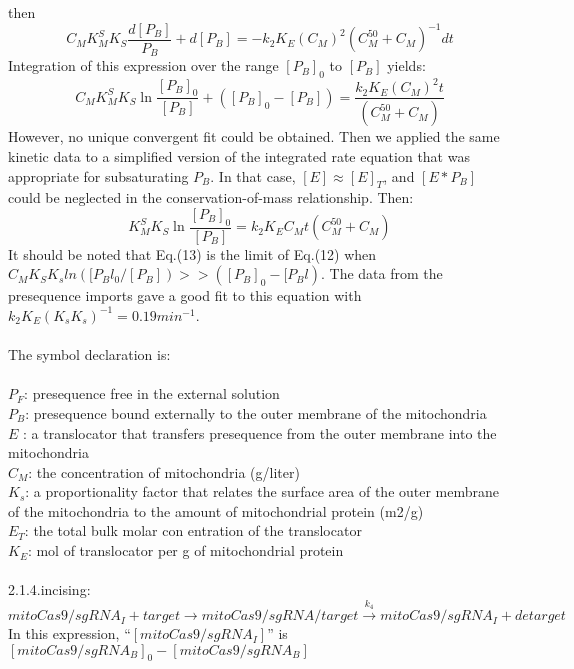 \documentclass[UTF8]{ctexart}
\begin{document}
then
\begin{equation}
C_MK_M^SK_S \frac{d[P_B]}{P_B}+d[P_B]=-k_2K_E(C_M)^2(C_M^{50}+C_M)^{-1} d t
\end{equation}
Integration of this expression over the range $[P_B]_0$ to $[P_B]$ yields:
\begin{equation}
C_MK_M^SK_S\ln\frac{[P_B]_0}{[P_B]}+([P_B]_0-[P_B])=\frac{k_2K_E(C_M)^2 t}{(C_M^{50}+C_M)}
\end{equation}
However, no unique convergent fit could be obtained. Then we applied the same kinetic data to a simplified version of the integrated rate equation that was appropriate for subsaturating $P_B$. In that case,  $[E] \approx [E]_T$, and $[E*P_B]$ could be neglected in the conservation-of-mass relationship. Then:
\begin{equation}
K_M^SK_S\ln\frac{[P_B]_0}{[P_B]}=k_2K_EC_Mt(C_M^{50}+C_M)
\end{equation}
It should be noted that Eq.(13) is the limit of Eq.(12) when $C_MK_S K_sln([P_Bl_0/[P_B]) >> ([P_B]_0 - [P_Bl)$. The data from the presequence imports gave a good fit to this equation with $k_2K_E(K_s K_s)^{-1} = 0.19 min^{-1}$.
	\\\\
	The symbol declaration is:\\\\
	$P_F$: presequence free in the external  solution\\
	$P_B$: presequence bound externally to the outer membrane of the mitochondria\\
	$E$ : a translocator that transfers presequence from the outer membrane into the mitochondria\\
	$C_M$: the concentration of mitochondria (g/liter)\\
	$K_s$: a proportionality factor that relates the surface area of the outer membrane of the mitochondria to the amount of mitochondrial protein (m2/g) \\
	$E_T$: the total bulk molar con entration of the translocator\\
	$K_E$: mol of translocator per g of mitochondrial protein
	\\\\ 
	2.1.4.incising:
	\begin{displaymath}
	mitoCas9/sgRNA_I+target\longrightarrow mitoCas9/sgRNA/target\stackrel{k_4} {\longrightarrow} mitoCas9/sgRNA_I+detarget
	\end{displaymath}
	In this expression, “$[mitoCas9/sgRNA_I]$” is $ [mitoCas9/sgRNA_B]_0-[mitoCas9/sgRNA_B]$ 
\end{document}
